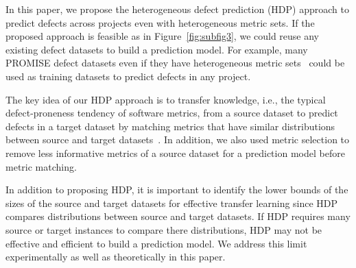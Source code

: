 
In this paper, we propose the heterogeneous defect prediction (HDP) approach
to predict defects across projects even with heterogeneous metric
sets.
If the proposed approach is feasible as in
Figure~\ref{fig:subfig3}, we could reuse any existing defect
datasets to build a prediction model. For example, many PROMISE defect datasets
even if they have heterogeneous metric sets~\cite{promise12} could be used as
training datasets to predict defects in any project.

The key idea of our HDP approach is to transfer knowledge, i.e., the typical defect-proneness tendency of software metrics, from a source dataset to predict defects in a target dataset by matching metrics that have
similar distributions between source and target datasets~\cite{Bird2011,DAmbros12,Menzies07,Ohlsson1996,Rahman13}. In addition, we also
used metric selection to remove less informative metrics of a source dataset
for a prediction model before metric matching.

In addition to proposing HDP, it is important to identify the lower bounds of the sizes of the source and target datasets for effective transfer learning since HDP compares distributions between source and target datasets. 
If HDP requires many source or target instances to compare there distributions, HDP may not be effective and efficient to build a prediction model. We address this limit experimentally as well as theoretically in this paper.


